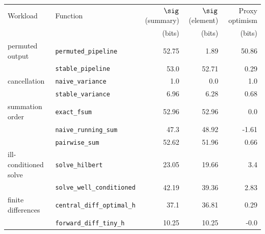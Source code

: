 \begin{tabular}{llrrr}
\toprule
Workload & Function & $\sig$(summary) & $\sig$(element) & Proxy optimism \\
 & & (bits) & (bits) & (bits) \\
\midrule
permuted output & \texttt{permuted\_pipeline} & 52.75 & 1.89 & 50.86 \\
 & \texttt{stable\_pipeline} & 53.0 & 52.71 & 0.29 \\
cancellation & \texttt{naive\_variance} & 1.0 & 0.0 & 1.0 \\
 & \texttt{stable\_variance} & 6.96 & 6.28 & 0.68 \\
summation order & \texttt{exact\_fsum} & 52.96 & 52.96 & 0.0 \\
 & \texttt{naive\_running\_sum} & 47.3 & 48.92 & -1.61 \\
 & \texttt{pairwise\_sum} & 52.62 & 51.96 & 0.66 \\
ill-conditioned solve & \texttt{solve\_hilbert} & 23.05 & 19.66 & 3.4 \\
 & \texttt{solve\_well\_conditioned} & 42.19 & 39.36 & 2.83 \\
finite differences & \texttt{central\_diff\_optimal\_h} & 37.1 & 36.81 & 0.29 \\
 & \texttt{forward\_diff\_tiny\_h} & 10.25 & 10.25 & -0.0 \\
\bottomrule
\end{tabular}
